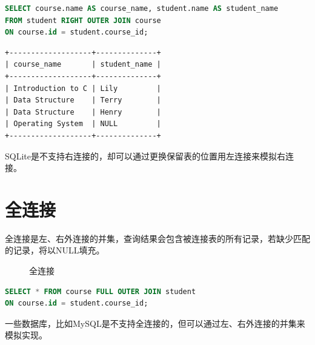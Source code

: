 \documentclass[12pt, openany, oneside]{book}
\begin{document}

\begin{lstlisting}[language=SQL]
SELECT course.name AS course_name, student.name AS student_name
FROM student RIGHT OUTER JOIN course
ON course.id = student.course_id;
\end{lstlisting}

\begin{tcolorbox}
\begin{verbatim}
+-------------------+--------------+
| course_name       | student_name |
+-------------------+--------------+
| Introduction to C | Lily         |
| Data Structure    | Terry        |
| Data Structure    | Henry        |
| Operating System  | NULL         |
+-------------------+--------------+
	\end{verbatim}
\end{tcolorbox}

SQLite是不支持右连接的，却可以通过更换保留表的位置用左连接来模拟右连接。\\

\section{全连接}

全连接是左、右外连接的并集，查询结果会包含被连接表的所有记录，若缺少匹配的记录，将以NULL填充。

\begin{figure}[H]
	\centering
	\caption{全连接}
\end{figure}


\begin{lstlisting}[language=SQL]
SELECT * FROM course FULL OUTER JOIN student
ON course.id = student.course_id;
\end{lstlisting}

一些数据库，比如MySQL是不支持全连接的，但可以通过左、右外连接的并集来模拟实现。\\

\end{document}
